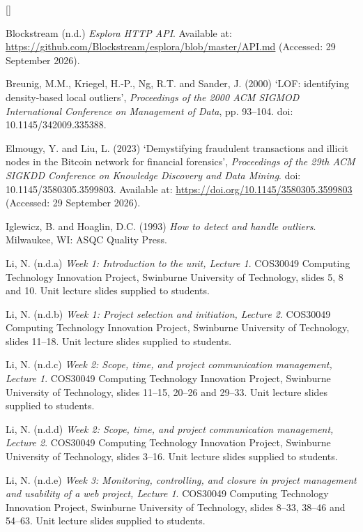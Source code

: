 \documentclass[a4paper,11pt]{article}
\newcounter{refnum}
\newenvironment{references}{%
  \sloppy\begin{list}{[\arabic{refnum}]}{\usecounter{refnum}\setlength{\labelwidth}{2.2em}%
    \setlength{\leftmargin}{2.8em}\setlength{\labelsep}{0.6em}%
    \setlength{\itemsep}{0.6\baselineskip}\setlength{\parsep}{0pt}}}%
  {\end{list}}
\begin{document}
\begin{references}
\item Blockstream (n.d.) \textit{Esplora HTTP API}. Available at: \url{https://github.com/Blockstream/esplora/blob/master/API.md} (Accessed: 29 September 2026).

\item Breunig, M.M., Kriegel, H.-P., Ng, R.T. and Sander, J. (2000) ‘LOF: identifying density-based local outliers’, \textit{Proceedings of the 2000 ACM SIGMOD International Conference on Management of Data}, pp. 93–104. doi: 10.1145/342009.335388.

\item Elmougy, Y. and Liu, L. (2023) ‘Demystifying fraudulent transactions and illicit nodes in the Bitcoin network for financial forensics’, \textit{Proceedings of the 29th ACM SIGKDD Conference on Knowledge Discovery and Data Mining}. doi: 10.1145/3580305.3599803. Available at: \url{https://doi.org/10.1145/3580305.3599803} (Accessed: 29 September 2026).

\item Iglewicz, B. and Hoaglin, D.C. (1993) \textit{How to detect and handle outliers}. Milwaukee, WI: ASQC Quality Press.

\item Li, N. (n.d.a) \textit{Week 1: Introduction to the unit, Lecture 1}. COS30049 Computing Technology Innovation Project, Swinburne University of Technology, slides 5, 8 and 10. Unit lecture slides supplied to students.

\item Li, N. (n.d.b) \textit{Week 1: Project selection and initiation, Lecture 2}. COS30049 Computing Technology Innovation Project, Swinburne University of Technology, slides 11–18. Unit lecture slides supplied to students.

\item Li, N. (n.d.c) \textit{Week 2: Scope, time, and project communication management, Lecture 1}. COS30049 Computing Technology Innovation Project, Swinburne University of Technology, slides 11–15, 20–26 and 29–33. Unit lecture slides supplied to students.

\item Li, N. (n.d.d) \textit{Week 2: Scope, time, and project communication management, Lecture 2}. COS30049 Computing Technology Innovation Project, Swinburne University of Technology, slides 3–16. Unit lecture slides supplied to students.

\item Li, N. (n.d.e) \textit{Week 3: Monitoring, controlling, and closure in project management and usability of a web project, Lecture 1}. COS30049 Computing Technology Innovation Project, Swinburne University of Technology, slides 8–33, 38–46 and 54–63. Unit lecture slides supplied to students.


\end{references}
\end{document}
